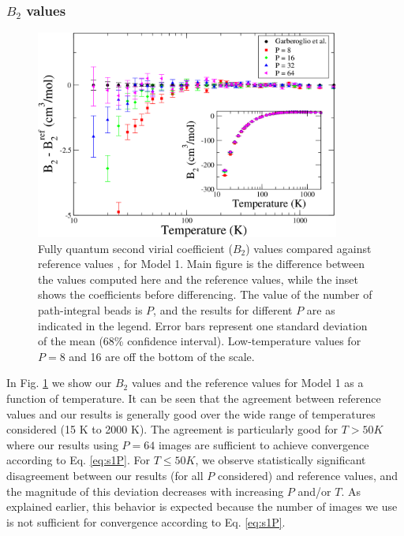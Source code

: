             \subsubsection{$B_2$ values}
                \begin{figure}[!htbp]
                    \centering
                    \includegraphics[width=10cm,keepaspectratio]{Chapter-4/Figures/s1GarberoglioAll.png}
                    \caption{Fully quantum second virial coefficient ($B_2$) values compared against reference values \cite{Garberoglio2014}, for Model 1. Main figure is the difference between the values computed here and the reference values, while the inset shows the coefficients before differencing. The value of the number of path-integral beads is $P$, and the results for different $P$ are as indicated in the legend. Error bars represent one standard deviation of the mean (68\% confidence interval). Low-temperature values for $P = 8$ and 16 are off the bottom of the scale.}
                    \label{fig:r0}
                \end{figure}
                In Fig. \ref{fig:r0} we show our $B_2$ values and the reference values for Model 1 as a function of temperature. It can be seen that the agreement between reference values and our results is generally good over the wide range of temperatures considered (15 K to 2000 K). The agreement is particularly good for $T > 50 K$ where our results using $P = 64$ images are sufficient to achieve convergence according to Eq. \eqref{eq:s1P}. For $T \le 50 K$, we observe statistically significant disagreement between our results (for all $P$ considered) and reference values, and the magnitude of this deviation decreases with increasing $P$ and/or $T$. As explained earlier, this behavior is expected because the number of images we use is not sufficient for convergence according to Eq. \eqref{eq:s1P}.
                

